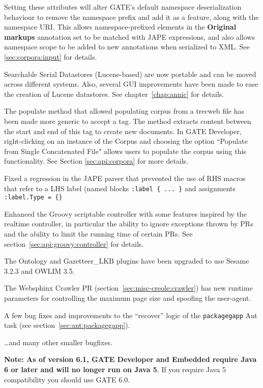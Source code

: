 Setting these attributes will alter GATE's default namespace deserialization
behaviour to remove the namespace prefix and add it as a feature, along with
the namespace URI.  This allows namespace-prefixed elements in the
\textbf{Original markups} annotation set to be matched with JAPE expressions,
and also allows namespace scope to be added to new annotations when serialized
to XML. See  \ref{sec:corpora:input} for details.

Searchable Serial Datastores (Lucene-based) are now portable and can be moved
across different systems. Also, several GUI improvements have been made to ease
the creation of Lucene datastores. See chapter~\ref{chap:annic} for details.

The populate method that allowed populating corpus from a trecweb file has been
made more generic to accept a tag. The method extracts content between the start
and end of this tag to create new documents. In GATE Developer, right-clicking 
on an instance of the Corpus and choosing the option ``Populate from Single
Concatenated File" allows users to populate the corpus using this functionality.
See Section \ref{sec:api:corpora} for more details.

Fixed a regression in the JAPE parser that prevented the use of RHS macros that
refer to a LHS label (named blocks \verb|:label { ... }| and assignments
\verb|:label.Type = {}|

Enhanced the Groovy scriptable controller with some features inspired by the
realtime controller, in particular the ability to ignore exceptions thrown by
PRs and the ability to limit the running time of certain PRs.  See
section~\ref{sec:api:groovy:controller} for details.

The Ontology and Gazetteer\_LKB plugins have been upgraded to use Sesame 3.2.3
and OWLIM 3.5.

The Websphinx Crawler PR (section~\ref{sec:misc-creole:crawler}) has new runtime
parameters for controlling the maximum page size and spoofing the user-agent.

A few bug fixes and improvements to the ``recover'' logic of the
\texttt{packagegapp} Ant task (see section~\ref{sec:ant:packagegapp}).

\ldots and many other smaller bugfixes.

\textbf{Note: As of version 6.1, GATE Developer and Embedded require Java 6 or
later and will no longer run on Java 5}.  If you require Java 5 compatibility
you should use GATE 6.0.

\ifnested\label{subsec:changes:6.0b1}\else\label{sec:changes:6.0b1}\fi

